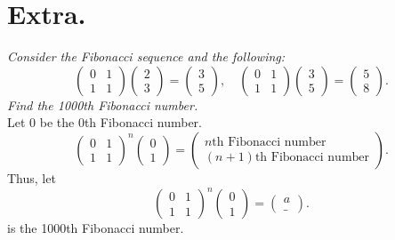 \documentclass[12pt]{article}
\begin{document}
\section*{Extra.}
\textit{Consider the Fibonacci sequence and the following:}
\begin{equation*}
	\begin{pmatrix} 0 & 1 \\ 1 & 1 \end{pmatrix}
	\begin{pmatrix} 2 \\ 3 \end{pmatrix}
	=
	\begin{pmatrix} 3 \\ 5 \end{pmatrix}
	, \quad
	\begin{pmatrix} 0 & 1 \\ 1 & 1 \end{pmatrix}
	\begin{pmatrix} 3 \\ 5 \end{pmatrix}
	=
	\begin{pmatrix} 5 \\ 8 \end{pmatrix}
	.
\end{equation*}
\textit{Find the 1000th Fibonacci number.} \\[\baselineskip]
Let $0$ be the $0$th Fibonacci number.
\begin{equation*}
	\begin{pmatrix} 0 & 1 \\ 1 & 1 \end{pmatrix}^n
	\begin{pmatrix} 0 \\ 1 \end{pmatrix}
	=
	\begin{pmatrix}
		n\text{th Fibonacci number} \\
		(n+1)\text{th Fibonacci number}
	\end{pmatrix}
	.
\end{equation*}
Thus, let
\begin{equation*}
	\begin{pmatrix} 0 & 1 \\ 1 & 1 \end{pmatrix}^n
	\begin{pmatrix} 0 \\ 1 \end{pmatrix}
	=
	\begin{pmatrix}
		a \\
		\_
	\end{pmatrix}
	.
\end{equation*}
 is the 1000th Fibonacci number.
\end{document}
